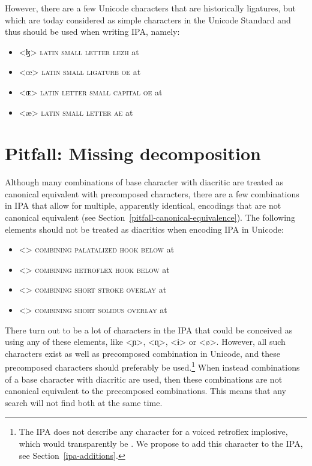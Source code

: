 However, there are a few Unicode characters that are historically ligatures, but
which are today considered as simple characters in the Unicode Standard and thus
should be used when writing IPA, namely:

\begin{itemize}
	\item[] <ɮ> \textsc{latin small letter lezh} at  
	\item[] <œ> \textsc{latin small ligature oe} at  
	\item[] <ɶ> \textsc{latin letter small capital oe} at  
	\item[] <æ> \textsc{latin small letter ae} at  
\end{itemize}

\section{Pitfall: Missing decomposition}
\label{pitfall-missing-decomposition}

Although many combinations of base character with diacritic are treated as
canonical equivalent with precomposed characters, there are a few combinations
in IPA that allow for multiple, apparently identical, encodings that are not
canonical equivalent (see Section~\ref{pitfall-canonical-equivalence}). The
following elements should not be treated as diacritics when encoding IPA in
Unicode: 
\begin{itemize}
  \item[] <{}> \textsc{combining palatalized hook below} at 
  \item[] <{}> \textsc{combining retroflex hook below} at 
  \item[] <> \textsc{combining short stroke overlay} at 
  \item[] <> \textsc{combining short solidus overlay} at 
\end{itemize} 

There turn out to be a lot of characters in the IPA that could be conceived as
using any of these elements, like <ɲ>, <ɳ>, <ɨ> or <ø>. However, all such
characters exist as well as precomposed combination in Unicode, and these
precomposed characters should preferably be used.\footnote{The IPA does not
describe any character for a voiced retroflex implosive, which would
transparently be . We propose to add this character to the IPA, see
Section~\ref{ipa-additions}.} When instead combinations of a base character with
diacritic are used, then these combinations are not canonical equivalent to the
precomposed combinations. This means that any search will not find both at the
same time.

